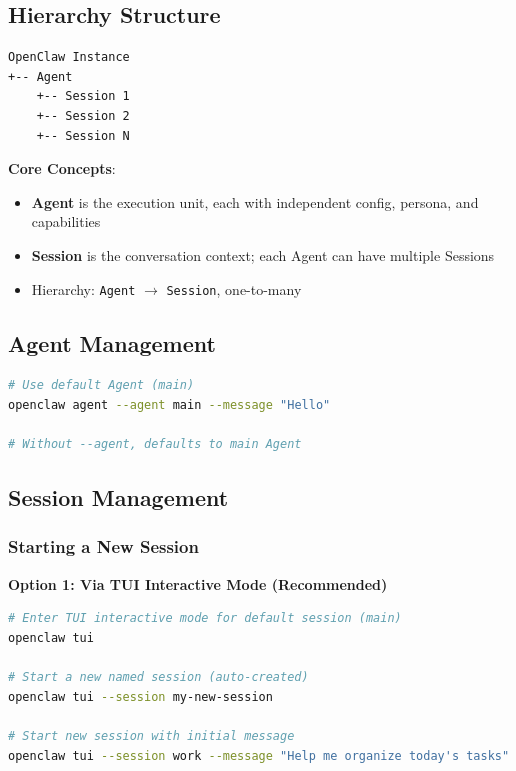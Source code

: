 \subsection{Hierarchy Structure}


\begin{lstlisting}
OpenClaw Instance
+-- Agent
    +-- Session 1
    +-- Session 2
    +-- Session N
\end{lstlisting}

\textbf{Core Concepts}:

\begin{itemize}
  \item \textbf{Agent} is the execution unit, each with independent config, persona, and capabilities
  \item \textbf{Session} is the conversation context; each Agent can have multiple Sessions
  \item Hierarchy: \texttt{Agent} $\rightarrow$ \texttt{Session}, one-to-many
\end{itemize}

\subsection{Agent Management}


\begin{lstlisting}[language=bash]
# Use default Agent (main)
openclaw agent --agent main --message "Hello"

# Without --agent, defaults to main Agent
\end{lstlisting}

\subsection{Session Management}


\subsubsection{Starting a New Session}


\textbf{Option 1: Via TUI Interactive Mode (Recommended)}

\begin{lstlisting}[language=bash]
# Enter TUI interactive mode for default session (main)
openclaw tui

# Start a new named session (auto-created)
openclaw tui --session my-new-session

# Start new session with initial message
openclaw tui --session work --message "Help me organize today's tasks"
\end{lstlisting}


